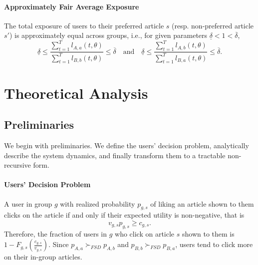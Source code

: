 \documentclass[letterpaper]{article} %
\begin{document}
\paragraph{Approximately Fair Average Exposure}
The total exposure of users to their preferred article $s$ (resp. non-preferred article $s'$) is approximately equal across groups, i.e.,  for given parameters $\underline{\delta} <1 < \overline{\delta}$,
\footnotesize
\begin{equation}
\label{eq:average_exposure}
    \underline{\delta} \leq \frac{\sum_{t=1}^T l_{A,a}(t,\theta)}{\sum_{t=1}^T l_{B,b}(t,\theta)}  \leq \overline{\delta}\quad \text{and} \quad \underline{\delta}\leq \frac{\sum_{t=1}^T l_{A,b}(t,\theta)}{\sum_{t=1}^T l_{B,a}(t,\theta)}  \leq \overline{\delta}.
\end{equation}
\normalsize

\section{Theoretical Analysis}\label{sec:analysis}

\subsection{Preliminaries}
We begin with preliminaries.
%
We define the users' decision problem, analytically describe the system dynamics, and finally transform them to a tractable non-recursive form.

\paragraph{Users' Decision Problem}
A user in group $g$ with realized probability $p_{g,s}$ of liking an article shown to them clicks on the article if and only if their expected utility is non-negative, that is
\footnotesize
\begin{equation}
    v_{g,s}p_{g,s} \geq c_{g,s}.
\end{equation}
\normalsize
Therefore, the fraction of users in $g$ who click on  article  $s$ shown to them is $1-F_{g,s}(\frac{c_{g,s}}{v_{g,s}})$.
%
Since $p_{A,a} \succ_{FSD} p_{A, b}$ and $p_{B,b} \succ_{FSD} p_{B, a}$, users tend to click more on their in-group articles.
\end{document}
